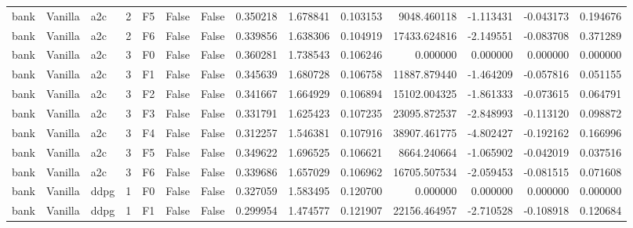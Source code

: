 \begin{tabular}{lllrlllrrrrrrr}
      bank & Vanilla &       a2c &     2 &  F5 &           False &            False &  0.350218 &  1.678841 & 0.103153 &      9048.460118 &          -1.113431 &       -0.043173 &            0.194676 \\
      bank & Vanilla &       a2c &     2 &  F6 &           False &            False &  0.339856 &  1.638306 & 0.104919 &     17433.624816 &          -2.149551 &       -0.083708 &            0.371289 \\
      bank & Vanilla &       a2c &     3 &  F0 &           False &            False &  0.360281 &  1.738543 & 0.106246 &         0.000000 &           0.000000 &        0.000000 &            0.000000 \\
      bank & Vanilla &       a2c &     3 &  F1 &           False &            False &  0.345639 &  1.680728 & 0.106758 &     11887.879440 &          -1.464209 &       -0.057816 &            0.051155 \\
      bank & Vanilla &       a2c &     3 &  F2 &           False &            False &  0.341667 &  1.664929 & 0.106894 &     15102.004325 &          -1.861333 &       -0.073615 &            0.064791 \\
      bank & Vanilla &       a2c &     3 &  F3 &           False &            False &  0.331791 &  1.625423 & 0.107235 &     23095.872537 &          -2.848993 &       -0.113120 &            0.098872 \\
      bank & Vanilla &       a2c &     3 &  F4 &           False &            False &  0.312257 &  1.546381 & 0.107916 &     38907.461775 &          -4.802427 &       -0.192162 &            0.166996 \\
      bank & Vanilla &       a2c &     3 &  F5 &           False &            False &  0.349622 &  1.696525 & 0.106621 &      8664.240664 &          -1.065902 &       -0.042019 &            0.037516 \\
      bank & Vanilla &       a2c &     3 &  F6 &           False &            False &  0.339686 &  1.657029 & 0.106962 &     16705.507534 &          -2.059453 &       -0.081515 &            0.071608 \\
      bank & Vanilla &      ddpg &     1 &  F0 &           False &            False &  0.327059 &  1.583495 & 0.120700 &         0.000000 &           0.000000 &        0.000000 &            0.000000 \\
      bank & Vanilla &      ddpg &     1 &  F1 &           False &            False &  0.299954 &  1.474577 & 0.121907 &     22156.464957 &          -2.710528 &       -0.108918 &            0.120684 \\

\end{tabular}
